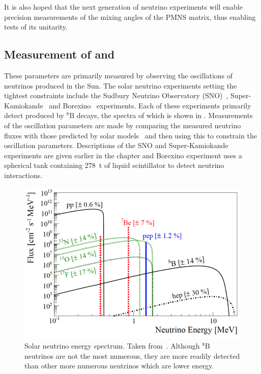It is also hoped that the next generation of neutrino experiments will enable precision measurements of the mixing angles of the PMNS matrix, thus enabling tests of its unitarity.

\subsection{Measurement of  and }
\label{sec:theory:currentState:solar}

These parameters are primarily measured by observing the oscillations of neutrinos produced in the Sun.
The solar neutrino experiments setting the tightest constraints include the Sudbury Neutrino Observatory (SNO)~\cite{snoCombined}, Super-Kamiokande~\cite{superKReview} and Borexino~\cite{borexino} experiments.
Each of these experiments primarily detect \nue produced by $^{8}\text{B}$ decays, the spectra of which is shown in .
Measurements of the oscillation parameters are made by comparing the measured neutrino fluxes with those predicted by solar models~\cite{solarModel} and then using this to constrain the oscillation parameters.
Descriptions of the SNO and Super-Kamiokande experiments are given earlier in the chapter and Borexino experiment uses a spherical tank containing 278~t of liquid scintillator to detect neutrino interactions.

\begin{figure}[h]
  \centering
  \includegraphics[width=.7\linewidth]{files/figures/theory/solarNeutrinoSpectrum}
  \caption[Solar neutrino energy spectrum.]{Solar neutrino energy spectrum. Taken from~\cite{solarNuFluxes}. Although $^{8}\text{B}$ neutrinos are not the most numerous, they are more readily detected than other more numerous neutrinos which are lower energy.}
  \label{fig:solarNuFluxes}
\end{figure}


